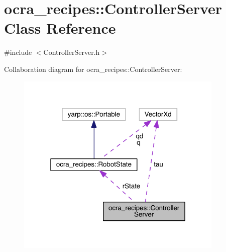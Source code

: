 \hypertarget{classocra__recipes_1_1ControllerServer}{}\section{ocra\+\_\+recipes\+:\+:Controller\+Server Class Reference}
\label{classocra__recipes_1_1ControllerServer}


{\ttfamily \#include $<$Controller\+Server.\+h$>$}



Collaboration diagram for ocra\+\_\+recipes\+:\+:Controller\+Server\+:\nopagebreak
\begin{figure}[H]
\begin{center}
\leavevmode
\includegraphics[width=280pt]{d7/d59/classocra__recipes_1_1ControllerServer__coll__graph}
\end{center}
\end{figure}
